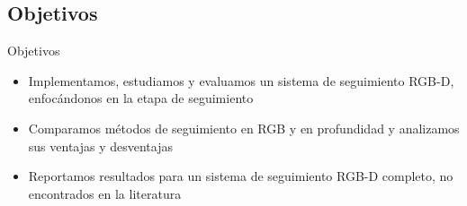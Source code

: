 \documentclass[]{beamer}
\begin{document}
\subsection{Objetivos}
\begin{frame}{Objetivos}

    \begin{itemize}
        \item Implementamos, estudiamos y evaluamos un sistema de seguimiento RGB-D, enfocándonos en la etapa de seguimiento
        \item Comparamos métodos de seguimiento en RGB y en profundidad y analizamos sus ventajas y desventajas
        \item Reportamos resultados para un sistema de seguimiento RGB-D completo, no encontrados en la literatura
    \end{itemize}
\end{frame}


\end{document}
